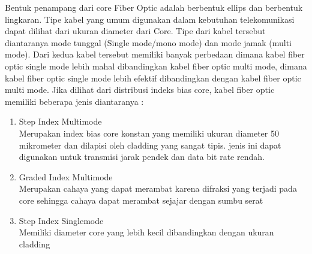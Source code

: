 \begin{flushleft}
Bentuk penampang dari core Fiber Optic adalah berbentuk ellips dan berbentuk lingkaran. Tipe kabel yang umum digunakan dalam kebutuhan telekomunikasi dapat dilihat dari ukuran diameter dari Core. Tipe dari kabel tersebut diantaranya mode tunggal (Single mode/mono mode) dan mode jamak (multi mode). Dari kedua kabel tersebut memiliki banyak perbedaan dimana kabel fiber optic single mode lebih mahal dibandingkan kabel fiber optic multi mode, dimana kabel fiber optic single mode lebih efektif dibandingkan dengan kabel fiber optic multi mode. Jika dilihat dari distribusi indeks bias core, kabel fiber optic memiliki beberapa jenis diantaranya : 
\begin{enumerate}
\item Step Index Multimode \\ Merupakan index bias core konstan yang memiliki ukuran diameter 50 mikrometer dan dilapisi oleh cladding yang sangat tipis. jenis ini dapat digunakan untuk transmisi jarak pendek dan data bit rate rendah.
\item Graded Index Multimode \\ Merupakan cahaya yang dapat merambat karena difraksi yang terjadi pada core sehingga cahaya dapat merambat sejajar dengan sumbu serat
\item Step Index Singlemode \\ Memiliki diameter core yang lebih kecil dibandingkan dengan ukuran cladding
\end{enumerate}
\end{flushleft}
